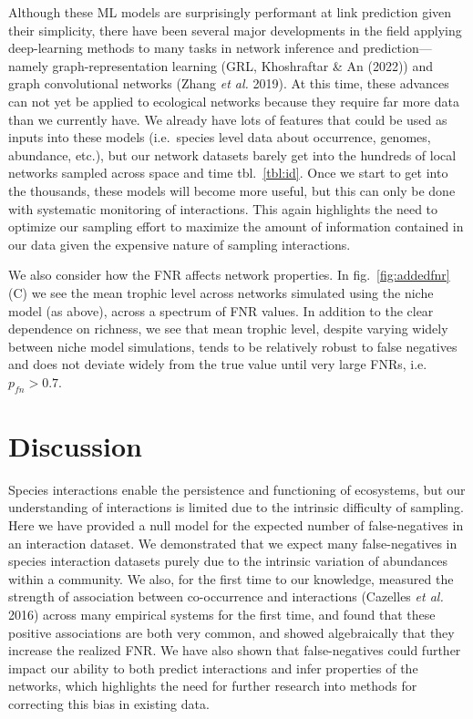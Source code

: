\documentclass[11pt]{article}
\begin{document}
Although these ML models are surprisingly performant at link prediction
given their simplicity, there have been several major developments in
the field applying deep-learning methods to many tasks in network
inference and prediction---namely graph-representation learning (GRL,
Khoshraftar \& An (2022)) and graph convolutional networks (Zhang
\emph{et al.} 2019). At this time, these advances can not yet be applied
to ecological networks because they require far more data than we
currently have. We already have lots of features that could be used as
inputs into these models (i.e.~species level data about occurrence,
genomes, abundance, etc.), but our network datasets barely get into the
hundreds of local networks sampled across space and time
tbl.~\ref{tbl:id}. Once we start to get into the thousands, these models
will become more useful, but this can only be done with systematic
monitoring of interactions. This again highlights the need to optimize
our sampling effort to maximize the amount of information contained in
our data given the expensive nature of sampling interactions.

We also consider how the FNR affects network properties. In
fig.~\ref{fig:addedfnr}(C) we see the mean trophic level across networks
simulated using the niche model (as above), across a spectrum of FNR
values. In addition to the clear dependence on richness, we see that
mean trophic level, despite varying widely between niche model
simulations, tends to be relatively robust to false negatives and does
not deviate widely from the true value until very large FNRs,
i.e.~\(p_{fn} > 0.7\).

\hypertarget{discussion}{%
\section{Discussion}\label{discussion}}

Species interactions enable the persistence and functioning of
ecosystems, but our understanding of interactions is limited due to the
intrinsic difficulty of sampling. Here we have provided a null model for
the expected number of false-negatives in an interaction dataset. We
demonstrated that we expect many false-negatives in species interaction
datasets purely due to the intrinsic variation of abundances within a
community. We also, for the first time to our knowledge, measured the
strength of association between co-occurrence and interactions (Cazelles
\emph{et al.} 2016) across many empirical systems for the first time,
and found that these positive associations are both very common, and
showed algebraically that they increase the realized FNR. We have also
shown that false-negatives could further impact our ability to both
predict interactions and infer properties of the networks, which
highlights the need for further research into methods for correcting
this bias in existing data.
\end{document}
